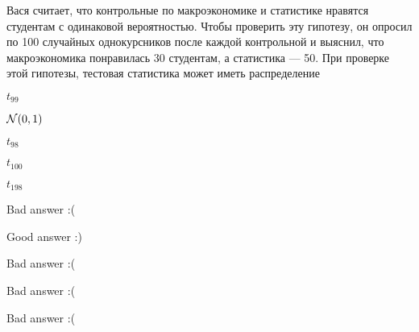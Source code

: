 
\begin{question}
Вася считает, что контрольные по макроэкономике и статистике нравятся
студентам с одинаковой вероятностью. Чтобы проверить эту гипотезу, он
опросил по 100 случайных однокурсников после каждой контрольной и
выяснил, что макроэкономика понравилась 30 студентам, а статистика ---
50. При проверке этой гипотезы, тестовая статистика может иметь
распределение
\begin{answerlist}
  \item \(t_{99}\)
  \item \(\mathcal{N}(0,1)\)
  \item \(t_{98}\)
  \item \(t_{100}\)
  \item \(t_{198}\)
\end{answerlist}
\end{question}

\begin{solution}
\begin{answerlist}
  \item Bad answer :(
  \item Good answer :)
  \item Bad answer :(
  \item Bad answer :(
  \item Bad answer :(
\end{answerlist}
\end{solution}

